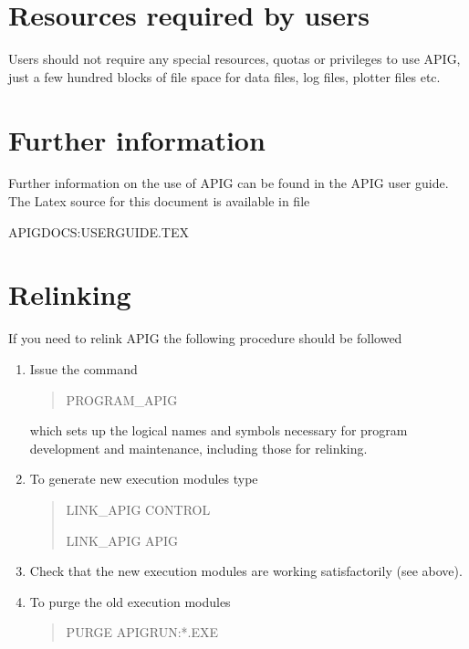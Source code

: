 \section{Resources required by users}

Users should not require any special resources, quotas or privileges
to use APIG, just a few hundred blocks of file space for data files,
log files, plotter files etc.

\section{Further information}

Further information on the use of APIG can be found in the APIG user 
guide. The Latex source for this document is available in file

\begin{center}

APIGDOCS:USERGUIDE.TEX

\end{center}

\section{Relinking}

If you need to relink APIG the following procedure should be followed

\begin{enumerate}

  \item Issue the command

   \begin{verse}

PROGRAM\_APIG

   \end{verse}

   which sets up the logical names and symbols necessary for program
   development and maintenance, including those for relinking.

  \item To generate new execution modules type

   \begin{verse}

LINK\_APIG CONTROL

LINK\_APIG APIG

   \end{verse}

  \item Check that the new execution modules are working satisfactorily
   (see above).

  \item To purge the old execution modules

   \begin{verse}

PURGE APIGRUN:*.EXE

   \end{verse}

\end{enumerate}

